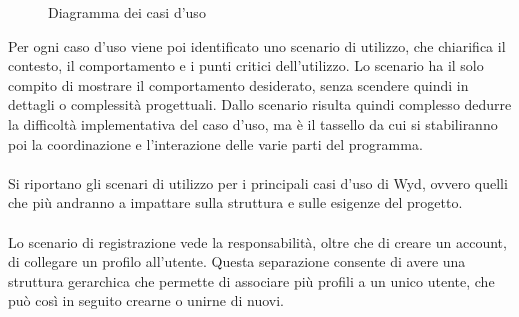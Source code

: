 \begin{figure}[htb]
    \centering
    \caption{Diagramma dei casi d'uso}
\end{figure}

Per ogni caso d'uso viene poi identificato uno scenario di utilizzo,
che chiarifica il contesto, il comportamento e i punti critici dell'utilizzo.
Lo scenario ha il solo compito di mostrare il comportamento desiderato,
senza scendere quindi in dettagli o complessità progettuali.
Dallo scenario risulta quindi complesso dedurre la difficoltà implementativa del caso d'uso,
ma è il tassello da cui si stabiliranno poi la coordinazione e l'interazione delle varie parti del programma.\\
\\
Si riportano gli scenari di utilizzo per i principali casi d'uso di Wyd,
ovvero quelli che più andranno a impattare sulla struttura e sulle esigenze del progetto.\\
\\
Lo scenario di registrazione vede la responsabilità, oltre che di creare un account,
di collegare un profilo all'utente.
Questa separazione consente di avere una struttura gerarchica
che permette di associare più profili a un unico utente,
che può così in seguito crearne o unirne di nuovi.\\


